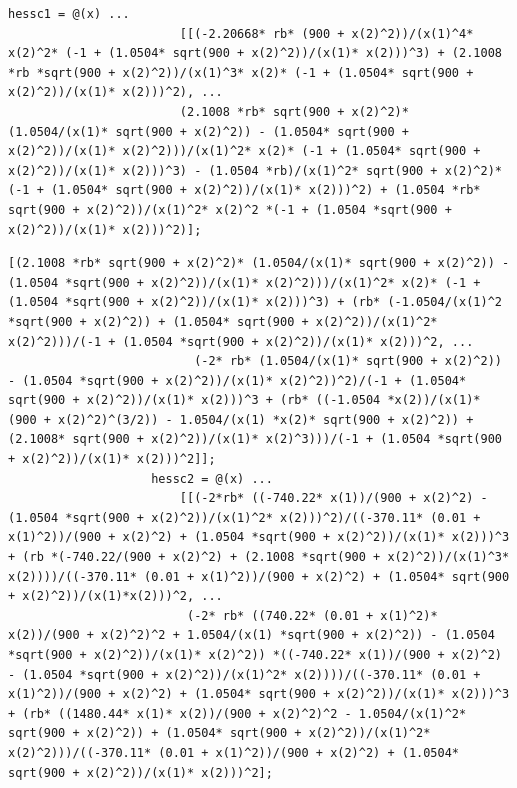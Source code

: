 \documentclass[10pt, a4paper]{article}
\begin{document}
\begin{minipage}{\linewidth}
\begin{lstlisting}[style=myStyle, caption= trecho de c\'odigo do problema 02 (barreira) (1/2), label=list_p02_bar_1]
                  hessc1 = @(x) ...
                        [[(-2.20668* rb* (900 + x(2)^2))/(x(1)^4* x(2)^2* (-1 + (1.0504* sqrt(900 + x(2)^2))/(x(1)* x(2)))^3) + (2.1008 *rb *sqrt(900 + x(2)^2))/(x(1)^3* x(2)* (-1 + (1.0504* sqrt(900 + x(2)^2))/(x(1)* x(2)))^2), ...
                        (2.1008 *rb* sqrt(900 + x(2)^2)* (1.0504/(x(1)* sqrt(900 + x(2)^2)) - (1.0504* sqrt(900 + x(2)^2))/(x(1)* x(2)^2)))/(x(1)^2* x(2)* (-1 + (1.0504* sqrt(900 + x(2)^2))/(x(1)* x(2)))^3) - (1.0504 *rb)/(x(1)^2* sqrt(900 + x(2)^2)* (-1 + (1.0504* sqrt(900 + x(2)^2))/(x(1)* x(2)))^2) + (1.0504 *rb* sqrt(900 + x(2)^2))/(x(1)^2* x(2)^2 *(-1 + (1.0504 *sqrt(900 + x(2)^2))/(x(1)* x(2)))^2)];
      \end{lstlisting}
\end{minipage}

\begin{minipage}{\linewidth}
\begin{lstlisting}[style=myStyle, caption= trecho de c\'odigo do problema 02 (barreira) (2/2), label=list_p02_bar_2]
                         [(2.1008 *rb* sqrt(900 + x(2)^2)* (1.0504/(x(1)* sqrt(900 + x(2)^2)) - (1.0504 *sqrt(900 + x(2)^2))/(x(1)* x(2)^2)))/(x(1)^2* x(2)* (-1 + (1.0504 *sqrt(900 + x(2)^2))/(x(1)* x(2)))^3) + (rb* (-1.0504/(x(1)^2 *sqrt(900 + x(2)^2)) + (1.0504* sqrt(900 + x(2)^2))/(x(1)^2* x(2)^2)))/(-1 + (1.0504 *sqrt(900 + x(2)^2))/(x(1)* x(2)))^2, ...
                          (-2* rb* (1.0504/(x(1)* sqrt(900 + x(2)^2)) - (1.0504 *sqrt(900 + x(2)^2))/(x(1)* x(2)^2))^2)/(-1 + (1.0504* sqrt(900 + x(2)^2))/(x(1)* x(2)))^3 + (rb* ((-1.0504 *x(2))/(x(1)* (900 + x(2)^2)^(3/2)) - 1.0504/(x(1) *x(2)* sqrt(900 + x(2)^2)) + (2.1008* sqrt(900 + x(2)^2))/(x(1)* x(2)^3)))/(-1 + (1.0504 *sqrt(900 + x(2)^2))/(x(1)* x(2)))^2]];
                    hessc2 = @(x) ...
                        [[(-2*rb* ((-740.22* x(1))/(900 + x(2)^2) - (1.0504 *sqrt(900 + x(2)^2))/(x(1)^2* x(2)))^2)/((-370.11* (0.01 + x(1)^2))/(900 + x(2)^2) + (1.0504 *sqrt(900 + x(2)^2))/(x(1)* x(2)))^3 + (rb *(-740.22/(900 + x(2)^2) + (2.1008 *sqrt(900 + x(2)^2))/(x(1)^3* x(2))))/((-370.11* (0.01 + x(1)^2))/(900 + x(2)^2) + (1.0504* sqrt(900 + x(2)^2))/(x(1)*x(2)))^2, ...
                         (-2* rb* ((740.22* (0.01 + x(1)^2)* x(2))/(900 + x(2)^2)^2 + 1.0504/(x(1) *sqrt(900 + x(2)^2)) - (1.0504 *sqrt(900 + x(2)^2))/(x(1)* x(2)^2)) *((-740.22* x(1))/(900 + x(2)^2) - (1.0504 *sqrt(900 + x(2)^2))/(x(1)^2* x(2))))/((-370.11* (0.01 + x(1)^2))/(900 + x(2)^2) + (1.0504* sqrt(900 + x(2)^2))/(x(1)* x(2)))^3 + (rb* ((1480.44* x(1)* x(2))/(900 + x(2)^2)^2 - 1.0504/(x(1)^2* sqrt(900 + x(2)^2)) + (1.0504* sqrt(900 + x(2)^2))/(x(1)^2* x(2)^2)))/((-370.11* (0.01 + x(1)^2))/(900 + x(2)^2) + (1.0504* sqrt(900 + x(2)^2))/(x(1)* x(2)))^2];

\end{lstlisting}
\end{minipage}
\end{document}
